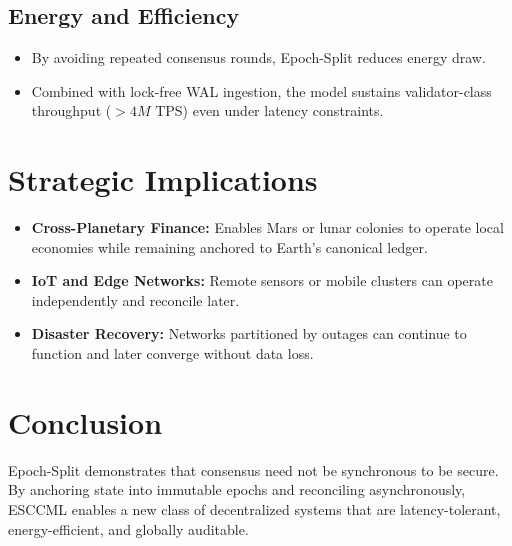 \documentclass[11pt, a4paper]{article}
\begin{document}
\subsection{Energy and Efficiency}
\begin{itemize}
    \item By avoiding repeated consensus rounds, Epoch-Split reduces energy draw.
    \item Combined with lock-free WAL ingestion, the model sustains validator-class throughput ($>4M$ TPS) even under latency constraints.
\end{itemize}

\section{Strategic Implications}
\begin{itemize}
    \item \textbf{Cross-Planetary Finance:} Enables Mars or lunar colonies to operate local economies while remaining anchored to Earth’s canonical ledger.
    \item \textbf{IoT and Edge Networks:} Remote sensors or mobile clusters can operate independently and reconcile later.
    \item \textbf{Disaster Recovery:} Networks partitioned by outages can continue to function and later converge without data loss.
\end{itemize}

\section{Conclusion}
Epoch-Split demonstrates that consensus need not be synchronous to be secure. By anchoring
state into immutable epochs and reconciling asynchronously, ESCCML enables a new class of
decentralized systems that are latency-tolerant, energy-efficient, and globally auditable.
\end{document}
